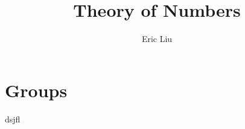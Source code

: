 \documentclass{report}
\title{Theory of Numbers}
\author{Eric Liu}
\date{}
\begin{document}
\maketitle
\newpage %

\tableofcontents
\pagebreak
\chapter{Groups}
dsjfl
\end{document}
